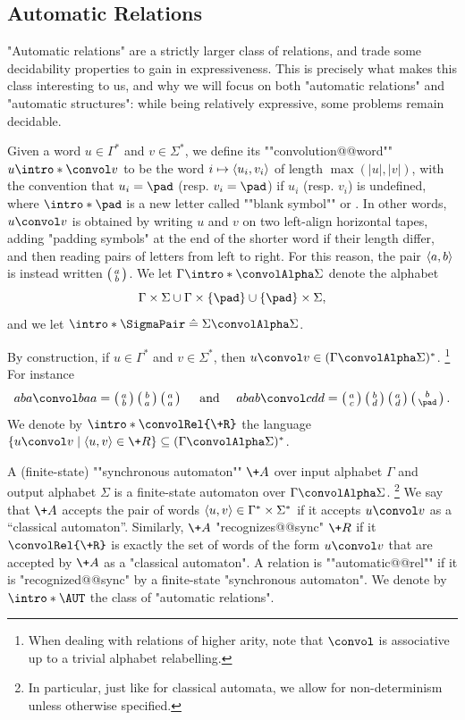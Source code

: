\subsection{Automatic Relations}

"Automatic relations" are a strictly larger class of relations,
and trade some decidability properties to gain in expressiveness.
This is precisely what makes this class interesting to us, and why we will focus
on both "automatic relations" and "automatic structures": while being relatively
expressive, some problems remain decidable.

Given a word $u \in \Gamma^*$ and $v\in \Sigma^*$, we define
its \AP""convolution@@word"" $u \intro*\convol v$ to be the word
$i \mapsto \langle u_i, v_i\rangle$ of length $\max{(|u|,|v|)}$,
with the convention that $u_i = \pad$ (resp. $v_i = \pad$)
if $u_i$ (resp. $v_i$) is undefined, where $\intro*\pad$ is a new letter called
""blank symbol"" or . In other words,
$u \convol v$ is obtained by writing $u$ and $v$ on two left-align horizontal tapes,
adding "padding symbols" at the end of the shorter word if their length differ,
and then reading pairs of letters from left to right.
For this reason, the pair $\langle a,b\rangle$ is instead written $\pair{a}{b}$.
We let \AP$\Gamma \intro*\convolAlpha \Sigma$ denote the alphabet
\[\Gamma \times \Sigma \cup \Gamma \times \{\pad\} \cup \{\pad\} \times \Sigma,\]
and we let $\intro*\SigmaPair \defeq \Sigma \convolAlpha \Sigma$.

By construction, if $u \in \Gamma^*$ and $v\in \Sigma^*$, then $u\convol v \in (\Gamma\convolAlpha\Sigma)^*$.%
\footnote{When dealing with relations of higher arity, note that $\convol$ is associative up to a trivial
alphabet relabelling.}
For instance
\[
	aba \convol baa = \pair{a}{b}\pair{b}{a}\pair{a}{a}
	\quad\text{ and }\quad
	abab \convol cdd = \pair{a}{c}\pair{b}{d}\pair{a}{d}\pair{b}{\pad}.
\]
We denote by \AP$\intro*\convolRel{\+R}$ the language
$\{ u \convol v \mid \tup{u,v} \in \+R\} \subseteq (\Gamma\convolAlpha\Sigma)^*$.

A (finite-state) \AP""synchronous automaton"" $\+A$ over input alphabet $\Gamma$ and output alphabet $\Sigma$
is a finite-state automaton over $\Gamma\convolAlpha \Sigma$.%
\footnote{In particular, just like for classical automata, we allow for non-determinism
unless otherwise specified.}
We say that $\+A$ accepts the pair of words $\langle u,v\rangle \in \Gamma^* \times \Sigma^*$ if
it accepts $u \convol v$ as a ``classical automaton''. Similarly, $\+A$ "recognizes@@sync"
$\+R$ if it $\convolRel{\+R}$ is exactly the set of
words of the form $u \convol v$ that are accepted by $\+A$ as a "classical automaton".
A relation is \AP""automatic@@rel"" if it is "recognized@@sync" by a finite-state "synchronous automaton".
We denote by \AP$\intro*\AUT$ the class of "automatic relations".

